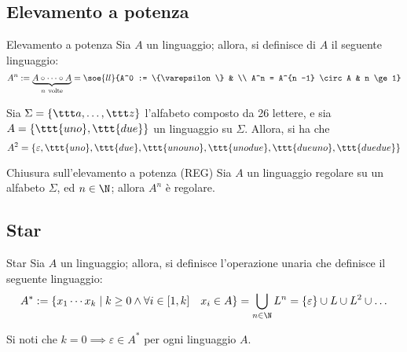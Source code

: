 \documentclass[a4paper, 12pt]{report}
\begin{document}
    \subsection{Elevamento a potenza}

    \begin{frameddefn}{Elevamento a potenza}
        Sia $A$ un linguaggio; allora, si definisce  di $A$ il seguente linguaggio: $$A^n := \underbrace{A \circ \cdots \circ A}_{n \ \textrm{volte}} = \soe{ll}{A^0 := \{\varepsilon \} & \\ A^n = A^{n -1} \circ A & n \ge 1}$$
    \end{frameddefn}

    \begin{example}
        Sia $\Sigma = \{\ttt a , \ldots, \ttt z\}$ l'alfabeto composto da 26 lettere, e sia $A = \{\ttt{uno}, \ttt{due}\}$ un linguaggio su $\Sigma$. Allora, si ha che $$A^2 = \{\varepsilon, \ttt{uno}, \ttt{due}, \ttt{unouno}, \ttt{unodue}, \ttt{dueuno}, \ttt{duedue}\}$$
    \end{example}

    \begin{framedprop}{Chiusura sull'elevamento a potenza (REG)}
        Sia $A$ un linguaggio regolare su un alfabeto $\Sigma$, ed $n \in \N$; allora $A^n$ è regolare.
    \end{framedprop}


    \subsection{Star}

    \begin{frameddefn}{Star}
        Sia $A$ un linguaggio; allora, si definisce l'operazione unaria  che definisce il seguente linguaggio: $$A^* := \{x_1 \cdots x_k \mid k \ge 0 \land \forall i \in [1, k] \quad x_i \in A\} = \displaystyle \bigcup_{n \in \N}{L^n}=\{ \varepsilon \} \cup L \cup L^2 \cup \ldots$$

        Si noti che $k = 0 \implies \varepsilon \in A^*$ per ogni linguaggio $A$.
    \end{frameddefn}
\end{document}
